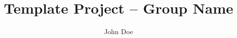 \documentclass[sigconf]{acmart}
\title{Template Project -- Group Name}
\author{John Doe}
\begin{document}
\begin{abstract}

\end{abstract}

\maketitle







\end{document}
